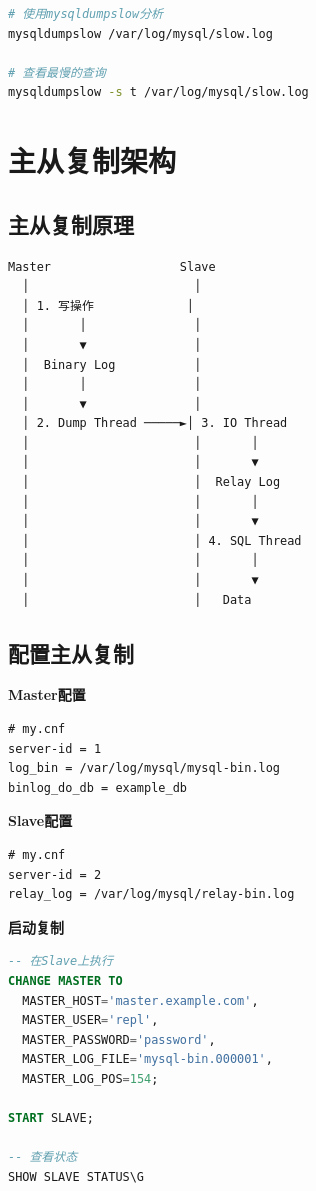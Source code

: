 \documentclass[12pt,UTF8]{ctexbook}
\begin{document}
\begin{lstlisting}[language=bash]
# 使用mysqldumpslow分析
mysqldumpslow /var/log/mysql/slow.log

# 查看最慢的查询
mysqldumpslow -s t /var/log/mysql/slow.log
\end{lstlisting}

\section{主从复制架构}
\label{sec:master-slave}

\subsection*{主从复制原理}

\begin{lstlisting}
Master                  Slave
  │                       │
  │ 1. 写操作             │
  │       │               │
  │       ▼               │
  │  Binary Log           │
  │       │               │
  │       ▼               │
  │ 2. Dump Thread ─────►│ 3. IO Thread
  │                       │       │
  │                       │       ▼
  │                       │  Relay Log
  │                       │       │
  │                       │       ▼
  │                       │ 4. SQL Thread
  │                       │       │
  │                       │       ▼
  │                       │   Data
\end{lstlisting}

\subsection*{配置主从复制}

\textbf{Master配置}
\begin{lstlisting}
# my.cnf
server-id = 1
log_bin = /var/log/mysql/mysql-bin.log
binlog_do_db = example_db
\end{lstlisting}

\textbf{Slave配置}
\begin{lstlisting}
# my.cnf
server-id = 2
relay_log = /var/log/mysql/relay-bin.log
\end{lstlisting}

\textbf{启动复制}
\begin{lstlisting}[language=sql]
-- 在Slave上执行
CHANGE MASTER TO
  MASTER_HOST='master.example.com',
  MASTER_USER='repl',
  MASTER_PASSWORD='password',
  MASTER_LOG_FILE='mysql-bin.000001',
  MASTER_LOG_POS=154;

START SLAVE;

-- 查看状态
SHOW SLAVE STATUS\G
\end{lstlisting}
\end{document}
